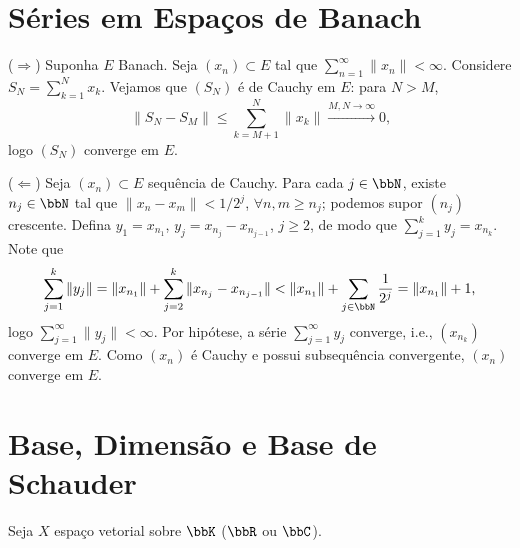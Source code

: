 
\section{Séries em Espaços de Banach}


\begin{myproof}
	($\Rightarrow$) Suponha $E$ Banach. Seja $(x_n)\subset E$ tal que $\sum_{n=1}^{\infty}\|x_n\|<\infty$.
	Considere $S_N=\sum_{k=1}^{N}x_k$. Vejamos que $(S_N)$ é de Cauchy em $E$: para $N>M$,
	$$\|S_N-S_M\|\leq \sum_{k=M+1}^{N}\|x_k\|\xrightarrow{M,N\to\infty}0\text{,}$$
	logo $(S_N)$ converge em $E$.

	($\Leftarrow$) Seja $(x_n)\subset E$ sequência de Cauchy. Para cada $j\in\bbN$, existe $n_j\in\bbN$
	tal que $\|x_n-x_m\|<1/2^j$, $\forall n,m\geq n_j$; podemos supor $(n_j)$ crescente. Defina
	$y_1=x_{n_1}$, $y_j=x_{n_j}-x_{n_{j-1}}$, $j\geq 2$, de modo que $\sum_{j=1}^{k}y_j=x_{n_k}$. Note que
	$$\sum_{j=1}^{k}\|y_j\| = \|x_{n_1}\|+\sum_{j=2}^{k}\|x_{n_j}-x_{n_{j-1}}\| < \|x_{n_1}\|+\sum_{j\in\bbN}\frac{1}{2^j}=\|x_{n_1}\|+1\text{,}$$
	logo $\sum_{j=1}^{\infty}\|y_j\|<\infty$. Por hipótese, a série $\sum_{j=1}^{\infty}y_j$ converge, i.e.,
	$(x_{n_k})$ converge em $E$. Como $(x_n)$ é Cauchy e possui subsequência convergente, $(x_n)$ converge
	em $E$.
\end{myproof}

\section{Base, Dimensão e Base de Schauder}

Seja $X$ espaço vetorial sobre $\bbK$ ($\bbR$ ou $\bbC$).


